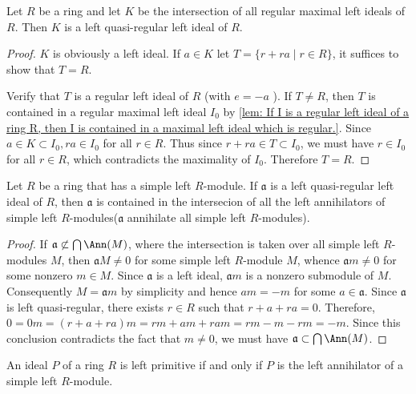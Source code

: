 \begin{lemma}
    Let $R$ be a ring and let $K$ be the intersection of all regular maximal left ideals of $R$.
    Then $K$ is a left quasi-regular left ideal of $R$.
    \begin{proof}
        $K$ is obviously a left ideal. If $a \in K$ let $T=\{r+r a \mid r \in R\}$, it suffices to show that $T=R$.

        Verify that $T$ is a regular left ideal of $R$ (with $e=-a$ ). If $T \neq R$, then $T$ is contained in a regular maximal left ideal $I_0$ by \ref{lem: If I is a regular left ideal of a ring R, then I is contained in a maximal left ideal which is regular.}.
        Since $a \in K \subset I_0, r a \in I_0$ for all $r \in R$. Thus since $r+r a \in T \subset I_0$, we must have $r \in I_0$ for all $r \in R$, which contradicts the maximality of $I_0$.
        Therefore $T=R$.
    \end{proof}
\end{lemma}


\begin{lemma}
    Let $R$ be a ring that has a simple left $R$-module.
    If $\mathfrak{a}$ is a left quasi-regular left ideal of $R$, then $\mathfrak{a}$ is contained in the intersecion of all the left annihilators of simple left $R$-modules($\mathfrak{a}$ annihilate all simple left $R$-modules).
    \begin{proof}
        If $\mathfrak{a} \not \subset \bigcap \Ann(M)$, where the intersection is taken over all simple left $R$-modules $M$, then $\mathfrak{a} M \neq 0$ for some simple left $R$-module $M$, whence $\mathfrak{a} m \neq 0$ for some nonzero $m \in M$. Since $\mathfrak{a}$ is a left ideal, $\mathfrak{a} m$ is a nonzero submodule of $M$.
        Consequently $M=\mathfrak{a} m$ by simplicity and hence $a m=-m$ for some $a \in \mathfrak{a}$.
        Since $\mathfrak{a}$ is left quasi-regular, there exists $r \in R$ such that $r+a+r a=0$.
        Therefore, $0=0 m =(r+a+r a) m=r m+a m+r a m=r m-m-r m=-m$.
        Since this conclusion contradicts the fact that $m \neq 0$, we must have $\mathfrak{a} \subset \bigcap \Ann(M)$.
    \end{proof}
\end{lemma}


\begin{lemma}
    \label{thm: left primitive}
    An ideal $P$ of a ring $R$ is left primitive if and only if $P$ is the left annihilator of a simple left $R$-module.
\end{lemma}



